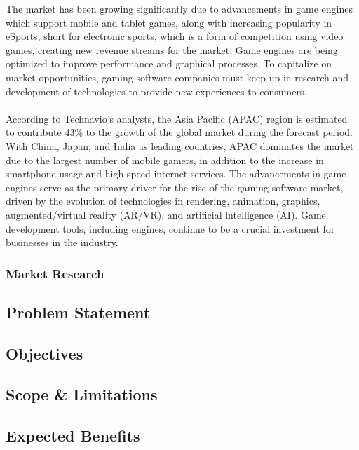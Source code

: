 The market has been growing significantly due to advancements in game engines which support mobile and tablet games, along with
increasing popularity in eSports, short for electronic sports, which is a form of competition using video games, creating new
revenue streams for the market.
Game engines are being optimized to improve performance and graphical processes.
To capitalize on market opportunities, gaming software companies must keep up in research and development of technologies to
provide new experiences to consumers.
\\\\
According to Technavio's analysts, the Asia Pacific (APAC) region is estimated to contribute 43\% to the growth of the global
market during the forecast period.
With China, Japan, and India as leading countries, APAC dominates the market due to the largest number of mobile gamers,
in addition to the increase in smartphone usage and high-speed internet services.
The advancements in game engines serve as the primary driver for the rise of the gaming software market, driven by the
evolution of technologies in rendering, animation, graphics, augmented/virtual reality (AR/VR), and artificial intelligence (AI).
Game development tools, including engines, continue to be a crucial investment for businesses in the industry.

\subsubsection*{Market Research}



\subsection{Problem Statement}
\label{subsec:problem-statement}

\subsection{Objectives}
\label{subsec:objectives}

\subsection{Scope \& Limitations}
\label{subsec:scope-and-limitation}

\subsection{Expected Benefits}
\label{subsec:expected-benefits}